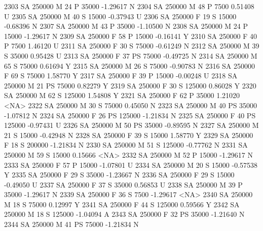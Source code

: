 \documentclass{article}
\begin{document}
\begin{Schunk}
\begin{Soutput}
2303     SA     250000   M  24         P  35000  -1.29617    N
2304     SA     250000   M  48         P   7500   0.51408    U
2305     SA     250000   M  40         S  15000  -0.37943    U
2306     SA     250000   F  19         S  15000  -0.68396    N
2307     SA     250000   M  43         P  35000  -1.10500    N
2308     SA     250000   M  24         P  15000  -1.29617    N
2309     SA     250000   F  58         P  15000  -0.16141    Y
2310     SA     250000   F  40         P   7500   1.46120    U
2311     SA     250000   F  30         S  75000  -0.61249    N
2312     SA     250000   M  39         S  35000   0.95428    U
2313     SA     250000   F  37        PS  75000  -0.49725    N
2314     SA     250000   M  65         S  75000   0.61694    Y
2315     SA     250000   M  26         S  75000  -0.90783    N
2316     SA     250000   F  69         S  75000   1.58770    Y
2317     SA     250000   F  39         P  15000  -0.00248    U
2318     SA     250000   M  21        PS  75000   0.82279    Y
2319     SA     250000   F  30         S 125000   0.86028    Y
2320     SA     250000   M  62         S 125000   1.54808    Y
2321     SA     250000   F  62         P  35000   1.21020 <NA>
2322     SA     250000   M  30         S  75000   0.45050    N
2323     SA     250000   M  40        PS  35000  -1.07812    N
2324     SA     250000   F  26        PS 125000  -1.21834    N
2325     SA     250000   F  40        PS 125000  -0.97431    U
2326     SA     250000   M  50        PS  35000  -0.89595    N
2327     SA     250000   M  21         S  15000  -0.42948    N
2328     SA     250000   F  39         S  15000   1.58770    Y
2329     SA     250000   F  18         S 200000  -1.21834    N
2330     SA     250000   M  51         S 125000  -0.77762    N
2331     SA     250000   M  59         S  15000   0.15666 <NA>
2332     SA     250000   M  52         P  15000  -1.29617    N
2333     SA     250000   F  57         P  15000  -1.07801    U
2334     SA     250000   M  20         S  15000  -0.57538    Y
2335     SA     250000   F  29         S  35000  -1.23667    N
2336     SA     250000   F  29         S  15000  -0.49050    U
2337     SA     250000   F  37         S  35000   0.56853    U
2338     SA     250000   M  39         P  35000  -1.29617    N
2339     SA     250000   F  36         S   7500  -1.29617 <NA>
2340     SA     250000   M  18         S  75000   0.12997    Y
2341     SA     250000   F  44         S 125000   0.59566    Y
2342     SA     250000   M  18         S 125000  -1.04094    A
2343     SA     250000   F  32        PS  35000  -1.21640    N
2344     SA     250000   M  41        PS  75000  -1.21834    N

\end{Soutput}
\end{Schunk}
\end{document}
